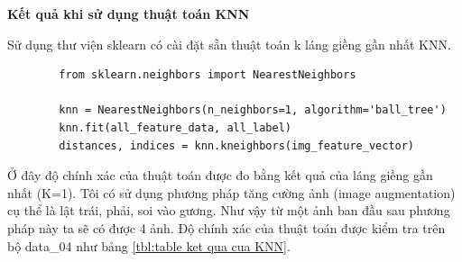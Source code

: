 \documentclass[12pt]{report}
\begin{document}
		\textbf{Kết quả khi sử dụng thuật toán KNN}
						
		Sử dụng thư viện sklearn có cài đặt sẵn thuật toán k láng giềng gần nhất KNN.
		\begin{lstlisting}
		from sklearn.neighbors import NearestNeighbors

		knn = NearestNeighbors(n_neighbors=1, algorithm='ball_tree')
		knn.fit(all_feature_data, all_label)
		distances, indices = knn.kneighbors(img_feature_vector)
		\end{lstlisting}
				
		Ở đây độ chính xác của thuật toán được đo bằng kết quả của láng giềng gần nhất (K=1). Tôi có sử dụng phương pháp tăng cường ảnh (image augmentation) cụ thể là lật trái, phải, soi vào gương. Như vậy từ một ảnh ban đầu sau phương pháp này ta sẽ có được 4 ảnh. Độ chính xác của thuật toán được kiểm tra trên bộ data\_04 như bảng \ref{tbl:table ket qua cua KNN}.
				
\end{document}
